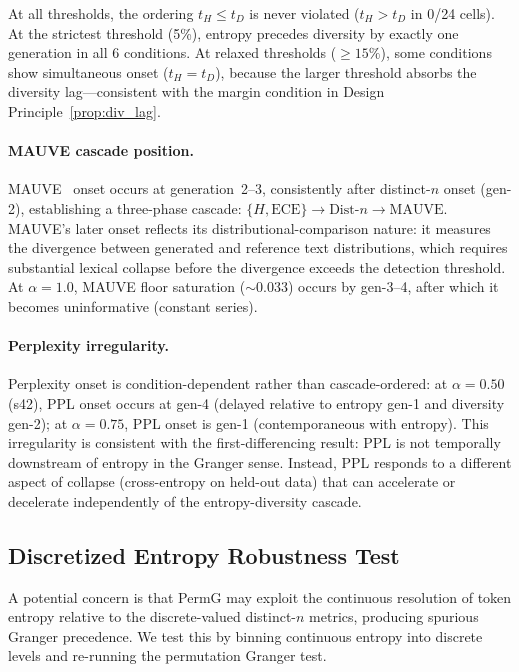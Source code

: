 At all thresholds, the ordering $t_H \leq t_D$ is never violated ($t_H > t_D$ in 0/24 cells).
At the strictest threshold (5\%), entropy precedes diversity by exactly one generation in all 6 conditions.
At relaxed thresholds (${\geq}15\%$), some conditions show simultaneous onset ($t_H = t_D$), because the larger threshold absorbs the diversity lag---consistent with the margin condition in Design Principle~\ref{prop:div_lag}.

\paragraph{MAUVE cascade position.}
MAUVE~\citep{pillutla2021mauve} onset occurs at generation~2--3, consistently after distinct-$n$ onset (gen-2), establishing a three-phase cascade: $\{H, \mathrm{ECE}\} \to \mathrm{Dist}\text{-}n \to \mathrm{MAUVE}$.
MAUVE's later onset reflects its distributional-comparison nature: it measures the divergence between generated and reference text distributions, which requires substantial lexical collapse before the divergence exceeds the detection threshold.
At $\alpha{=}1.0$, MAUVE floor saturation (${\sim}0.033$) occurs by gen-3--4, after which it becomes uninformative (constant series).

\paragraph{Perplexity irregularity.}
Perplexity onset is condition-dependent rather than cascade-ordered: at $\alpha{=}0.50$ (s42), PPL onset occurs at gen-4 (delayed relative to entropy gen-1 and diversity gen-2); at $\alpha{=}0.75$, PPL onset is gen-1 (contemporaneous with entropy).
This irregularity is consistent with the first-differencing result: PPL is not temporally downstream of entropy in the Granger sense.
Instead, PPL responds to a different aspect of collapse (cross-entropy on held-out data) that can accelerate or decelerate independently of the entropy-diversity cascade.


\subsection{Discretized Entropy Robustness Test}
\label{app:discretized_entropy}

A potential concern is that PermG may exploit the continuous resolution of token entropy relative to the discrete-valued distinct-$n$ metrics, producing spurious Granger precedence.
We test this by binning continuous entropy into discrete levels and re-running the permutation Granger test.

